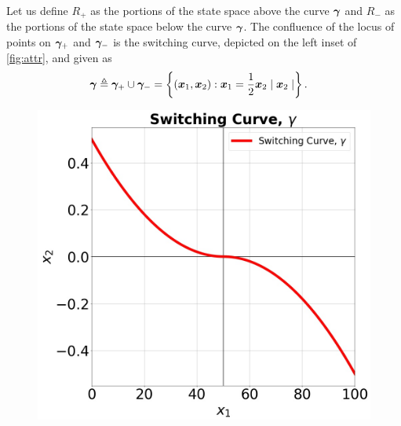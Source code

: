 Let us define $R_+$ as the portions of the state space above the curve $\bm{\gamma}$ and $R_-$ as the portions of the state space below the curve $\bm{\gamma}$.  The confluence of the locus of points on $\bm{\gamma}_+$ and $\bm{\gamma}_-$ is the switching curve, depicted on the left inset of \autoref{fig:attr}, and given as
%
\begin{align}
	\bm{\gamma} \triangleq \bm{\gamma}_+ \cup \bm{\gamma}_- &= \left\{(\bm{x}_1, \bm{x}_2): \bm{x}_1 = \frac{1}{2}\bm{x}_2 \mid \bm{x}_2 \mid \right\}.
\end{align}
%
\begin{figure}[tb!]
	\centering
	\begin{minipage}[b]{.24\textwidth}
		\includegraphics[width=1.0\textwidth, height=1.0\textwidth]{figures/switching_curve.jpg}
	\end{minipage}
	\begin{minipage}[b]{.24\textwidth}

\end{minipage}
\end{figure}
